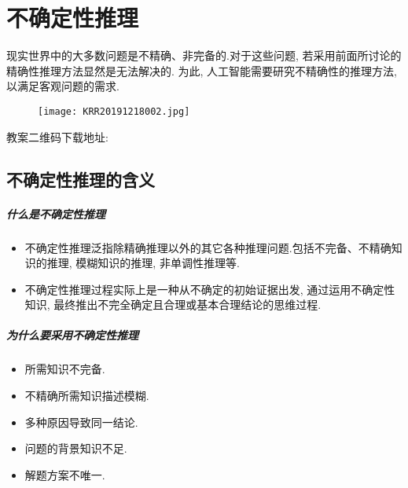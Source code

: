 \chapter{不确定性推理}
\begin{tcolorbox}[colback=white!50,colframe=orange!50,title=不精确性推理方法]
现实世界中的大多数问题是不精确、非完备的.对于这些问题, 若采用前面所讨论的精确性推理方法显然是无法解决的.
为此, 人工智能需要研究不精确性的推理方法, 以满足客观问题的需求.
\end{tcolorbox}
\begin{figure}[H]
\centering
\texttt{[image: KRR20191218002.jpg]}
\label{KRR20191218002}
\end{figure}
教案二维码下载地址: 
\section{不确定性推理的含义}
\paragraph{什么是不确定性推理}
\begin{itemize}
\item 不确定性推理泛指除精确推理以外的其它各种推理问题.包括不完备、不精确知识的推理, 模糊知识的推理, 非单调性推理等.
\item 不确定性推理过程实际上是一种从不确定的初始证据出发, 通过运用不确定性知识, 最终推出不完全确定且合理或基本合理结论的思维过程.
\end{itemize}
\paragraph{为什么要采用不确定性推理}
\begin{itemize}
\item  所需知识不完备.
\item  不精确所需知识描述模糊.
\item  多种原因导致同一结论.
\item  问题的背景知识不足.
\item  解题方案不唯一.
\end{itemize}
